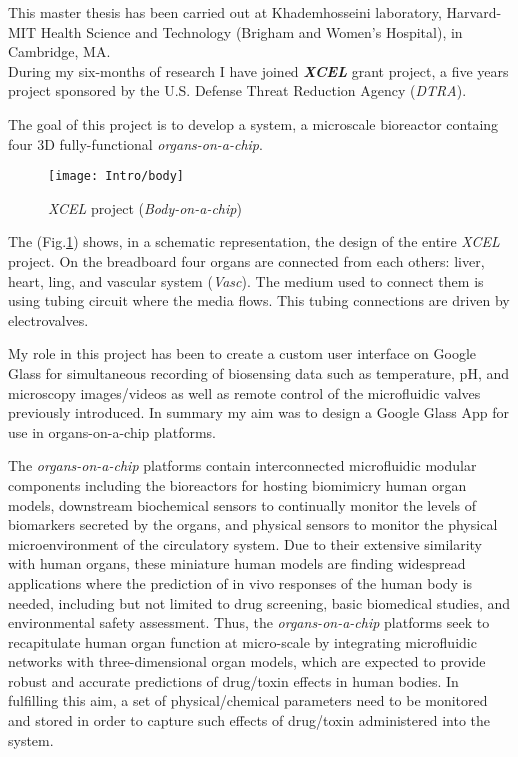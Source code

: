 This master thesis has been carried out at Khademhosseini laboratory, Harvard-MIT Health Science and Technology (Brigham and Women's Hospital), in Cambridge, MA.\\
During my six-months of research I have joined \textit{\textbf{XCEL}} grant project, a five years project sponsored by the U.S. Defense Threat Reduction Agency (\textit{DTRA}).

The goal of this project is to develop a system, a microscale bioreactor containg four 3D fully-functional \textit{organs-on-a-chip}.

\begin{figure}[h]
	\centering
	\texttt{[image: Intro/body]}
	\caption{\textit{XCEL} project (\textit{Body-on-a-chip})}
	\label{Fig:Body}
	
\end{figure}

The (Fig.\ref{Fig:Body}) shows, in a schematic representation, the design of the entire \textit{XCEL} project. On the breadboard four organs are connected from each others: liver, heart, ling, and vascular system (\textit{Vasc}). The medium used to connect them is using tubing circuit where the media flows. This tubing connections are driven by electrovalves.


My role in this project has been to create a custom user interface on Google Glass for simultaneous recording of biosensing data such as temperature, pH, and microscopy images/videos as well as remote control of the microfluidic valves previously introduced. In summary my aim was to design a Google Glass App for use in organs-on-a-chip platforms.

The \textit{organs-on-a-chip} platforms contain interconnected microfluidic modular components including the bioreactors for hosting biomimicry human organ models, downstream biochemical sensors to continually monitor the levels of biomarkers secreted by the organs, and physical sensors to monitor the physical microenvironment of the circulatory system. Due to their extensive similarity with human organs, these miniature human models are finding widespread applications where the prediction of in vivo responses of the human body is needed, including but not limited to drug screening, basic biomedical studies, and environmental safety assessment. Thus, the \textit{organs-on-a-chip} platforms seek to recapitulate human organ function at micro-scale by integrating microfluidic networks with three-dimensional organ models, which are expected to provide robust and accurate predictions of drug/toxin effects in human bodies. In fulfilling this aim, a set of physical/chemical parameters need to be monitored and stored in order to capture such effects of drug/toxin administered into the system.\\

